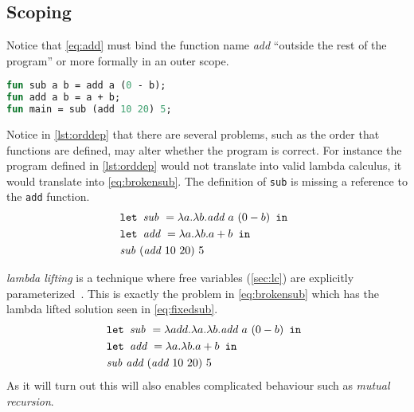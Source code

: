 \subsection{Scoping}\label{scoping}
Notice that \autoref{eq:add} must bind the function name \textit{add} ``outside the rest of the program'' or more formally in an outer scope.
\begin{lstlisting}[language=ML,caption={An order dependent program},label={lst:orddep}]
fun sub a b = add a (0 - b);
fun add a b = a + b;
fun main = sub (add 10 20) 5;
\end{lstlisting}
Notice in \autoref{lst:orddep} that there are several problems, such as the order that functions are defined, may alter whether the program is correct.
For instance the program defined in \autoref{lst:orddep} would not translate into valid lambda calculus, it would translate into \autoref{eq:brokensub}.
The definition of \texttt{sub} is missing a reference to the \texttt{add} function.
\begin{align}
  &\texttt{let } \textit{sub } = \lambda a.\lambda b.\textit{add } a \,\,(0 - b) \texttt{ in } \label{eq:brokensub}\\&\texttt{let } \textit{add } = \lambda a.\lambda b.a+b \texttt{ in } \tag*{}\\&\textit{sub } (\textit{add } 10 \,\, 20) \,\, 5\tag*{}
\end{align}

\textit{lambda lifting} is a technique where free variables (\autoref{sec:lc}) are explicitly parameterized~\cite{johnsson1985lambda}.
This is exactly the problem in \autoref{eq:brokensub} which has the lambda lifted solution seen in \autoref{eq:fixedsub}.
\begin{align}
  &\texttt{let } \textit{sub } = \lambda add.\lambda a.\lambda b.\textit{add } a \,\,(0 - b) \texttt{ in } \label{eq:fixedsub}\\&\texttt{let } \textit{add } = \lambda a.\lambda b.a+b \texttt{ in } \tag*{}\\&\textit{sub } \textit{add } (\textit{add } 10 \,\, 20) \,\, 5\tag*{}
\end{align}
As it will turn out this will also enables complicated behaviour such as \textit{mutual recursion}.

